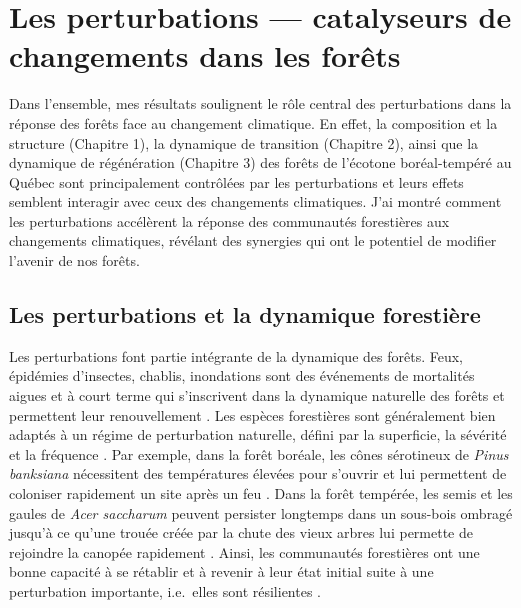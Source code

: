\hypertarget{les-perturbations-catalyseurs-de-changements-dans-les-foruxeats}{%
\section{Les perturbations --- catalyseurs de changements dans les
forêts}\label{les-perturbations-catalyseurs-de-changements-dans-les-foruxeats}}

Dans l'ensemble, mes résultats soulignent le rôle central des
perturbations dans la réponse des forêts face au changement climatique.
En effet, la composition et la structure (Chapitre 1), la dynamique de
transition (Chapitre 2), ainsi que la dynamique de régénération
(Chapitre 3) des forêts de l'écotone boréal-tempéré au Québec sont
principalement contrôlées par les perturbations et leurs effets semblent
interagir avec ceux des changements climatiques. J'ai montré comment les
perturbations accélèrent la réponse des communautés forestières aux
changements climatiques, révélant des synergies qui ont le potentiel de
modifier l'avenir de nos forêts.

\hypertarget{les-perturbations-et-la-dynamique-forestiuxe8re}{%
\subsection{Les perturbations et la dynamique
forestière}\label{les-perturbations-et-la-dynamique-forestiuxe8re}}

Les perturbations font partie intégrante de la dynamique des forêts.
Feux, épidémies d'insectes, chablis, inondations sont des événements de
mortalités aigues et à court terme \citep[\emph{pulse
disturbance};][]{bender_perturbation_1984} qui s'inscrivent dans la
dynamique naturelle des forêts et permettent leur renouvellement
\citep{attiwill_disturbance_1994}. Les espèces forestières sont
généralement bien adaptés à un régime de perturbation naturelle, défini
par la superficie, la sévérité et la fréquence
\citep{turner_disturbance_2010}. Par exemple, dans la forêt boréale, les
cônes sérotineux de \emph{Pinus banksiana} nécessitent des températures
élevées pour s'ouvrir et lui permettent de coloniser rapidement un site
après un feu \citep{burns_silvics_1990}. Dans la forêt tempérée, les
semis et les gaules de \emph{Acer saccharum} peuvent persister longtemps
dans un sous-bois ombragé jusqu'à ce qu'une trouée créée par la chute
des vieux arbres lui permette de rejoindre la canopée rapidement
\citep{burns_silvics_1990}. Ainsi, les communautés forestières ont une
bonne capacité à se rétablir et à revenir à leur état initial suite à
une perturbation importante, i.e.~elles sont résilientes
\citep{gunderson_ecological_2000}.

